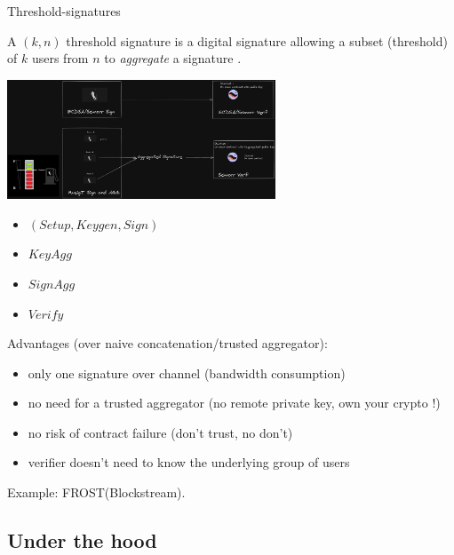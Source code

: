 \documentclass[aspectratio=43]{beamer}
\begin{document}
\begin{frame}{Threshold-signatures}


 A $(k,n)$ threshold signature is a digital signature allowing a subset (threshold) of $k$ users from $n$ to {\it aggregate} a signature . 
 
  {
   \begin{center}
        \includegraphics[width=8cm]{images/threshold.png}
        \end{center}
  }
  {
   \begin{itemize}
     \item $(Setup, Keygen, Sign)$
     \item $KeyAgg$
     \item $SignAgg$
     \item $Verify$
     \end{itemize}
      {
  Advantages (over naive concatenation/trusted aggregator):
  \begin{itemize}
  \item only one signature over channel (bandwidth consumption)
  \item no need for a trusted aggregator (no remote private key, own your crypto !)
  \item no risk of contract failure (don't trust, no don't)
  \item verifier doesn't need to know the underlying group of users
  
  \end{itemize}
 
  } 
   Example: FROST(Blockstream).
 }
\end{frame}
 \subsection{Under the hood}
 
\end{document}
